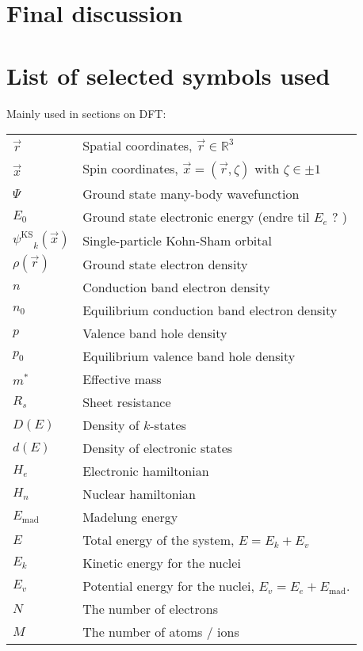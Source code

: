 \documentclass[11pt,bibliography=totoc,index=totoc]{scrbook}   %
\newcommand{\ksorb}{\ensuremath{\psi^{\mathrm{KS}}}}
\begin{document}
\chapter{Final discussion}


\printbibliography

\appendix
\chapter{List of selected symbols used}
  Mainly used in sections on DFT:

  \begin{tabular}{ll}
    $\vec{r}$ & Spatial coordinates, $\vec{r}\in\mathbb{R}^3$ \\
    $\vec{x}$ & Spin coordinates, $\vec{x}=(\vec{r},\zeta)$ with $\zeta\in\pm 1$ \\
    $\Psi$  & Ground state many-body wavefunction \\
    $E_0$   & Ground state electronic energy (endre til $E_e$ ? ) \\
    $\ksorb_k(\vec{x})$  & Single-particle Kohn-Sham orbital \\
    $\rho(\vec{r})$  & Ground state electron density \\
	$n$		& Conduction band electron density \\
	$n_0$	& Equilibrium conduction band electron density \\
	$p$		& Valence band hole density \\
	$p_0$	& Equilibrium valence band hole density \\
	$m^*$	& Effective mass \\
	$R_s$	& Sheet resistance \\
	$D(E)$	& Density of $k$-states \\
	$d(E)$	& Density of electronic states \\
    $H_e$   & Electronic hamiltonian \\
    $H_n$   & Nuclear hamiltonian \\
    $E_{\text{mad}}$ & Madelung energy \\
    $E$     & Total energy of the system, $E = E_k + E_v$ \\
    $E_k$   & Kinetic energy for the nuclei \\
    $E_v$   & Potential energy for the nuclei, $E_v = E_e + E_{\text{mad}}$. \\
    $N$     & The number of electrons \\
    $M$     & The number of atoms / ions
  \end{tabular}
\end{document}
